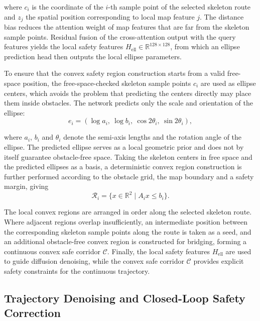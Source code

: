 \documentclass[journal]{IEEEtran}
\newcommand{\R}{\mathbb{R}}
\newcommand{\hell}{H_{\mathrm{ell}}}
\begin{document}
where $c_i$ is the coordinate of the $i$-th sample point of the selected
skeleton route and $z_j$ the spatial position corresponding to local map
feature $j$. The distance bias reduces the attention weight of map features
that are far from the skeleton sample points. Residual fusion of the
cross-attention output with the query features yields the local safety features
$\hell\in\R^{128\times128}$, from which an ellipse prediction head then outputs
the local ellipse parameters.

To ensure that the convex safety region construction starts from a valid
free-space position, the free-space-checked skeleton sample points $c_i$ are
used as ellipse centers, which avoids the problem that predicting the centers
directly may place them inside obstacles. The network predicts only the scale
and orientation of the ellipse:
\begin{equation}
e_i=(\log a_i,\ \log b_i,\ \cos 2\theta_i,\ \sin 2\theta_i),
\end{equation}

where $a_i$, $b_i$ and $\theta_i$ denote the semi-axis lengths and the rotation
angle of the ellipse. The predicted ellipse serves as a local geometric prior
and does not by itself guarantee obstacle-free space. Taking the skeleton
centers in free space and the predicted ellipses as a basis, a deterministic
convex region construction is further performed according to the obstacle grid,
the map boundary and a safety margin, giving
\begin{equation}
\mathcal R_i=\{x\in\R^2\mid A_ix\leq b_i\}.
\end{equation}

The local convex regions are arranged in order along the selected skeleton
route. Where adjacent regions overlap insufficiently, an intermediate position
between the corresponding skeleton sample points along the route is taken as a
seed, and an additional obstacle-free convex region is constructed for bridging,
forming a continuous convex safe corridor $\mathcal C$. Finally, the local
safety features $\hell$ are used to guide diffusion denoising, while the convex
safe corridor $\mathcal C$ provides explicit safety constraints for the
continuous trajectory.

\subsection{Trajectory Denoising and Closed-Loop Safety Correction}
\end{document}
